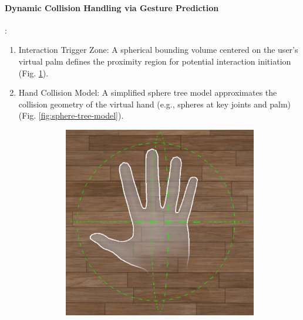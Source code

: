 \documentclass[runningheads]{llncs}
\begin{document}
\paragraph{Dynamic Collision Handling via Gesture Prediction}:
\begin{enumerate}
  \item Interaction Trigger Zone: A spherical bounding volume centered on the user's virtual palm defines the proximity region for potential interaction initiation (Fig. \ref{fig:bounding-volume}).
  \item Hand Collision Model: A simplified sphere tree model approximates the collision geometry of the virtual hand (e.g., spheres at key joints and palm) (Fig. \ref{fig:sphere-tree-model}).

  \begin{figure}
    \begin{subfigure}{0.48\linewidth} %
      \centering
      \includegraphics[width=\linewidth]{image/bounding-volume.pdf}
      \caption{} %
      \label{fig:bounding-volume}
    \end{subfigure}
    \hfill %
    \begin{subfigure}{0.48\linewidth} %
      \centering

\end{subfigure}
\end{figure}
\end{enumerate}
\end{document}

